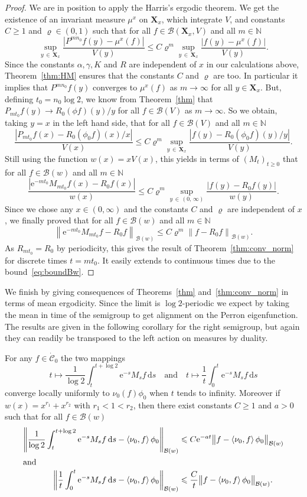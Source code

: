 \documentclass[AHL,Unicode,longabstracts,published]{cedram}
\renewcommand{\leq}{\leqslant}
\renewcommand{\geq}{\geqslant}
\newcommand{\Cdot}{{\dot{\mathcal{C}}}}
\newcommand{\B}{\mathcal{B}}
\newcommand{\N}{\mathbb{N}}
\newcommand{\1}{\mathds{1}}
\newcommand{\X}{\mathbf{X}}
\newcommand{\e}{\mathrm{e}}
\renewcommand{\d}{\mathrm{d}}
\begin{document}
\begin{proof}
We are in position to apply the Harris's ergodic theorem. We get the existence of an invariant measure $\mu^x$ on $\X_x$, which integrate $V$, and constants $C\geq1$ and $\varrho\in(0,1)$ such that for all $f\in\B(\X_x,V)$ and all $m\in\N$
\[
\sup_{y\,\in\,\X_x}\frac{\left|P^{mn_0}f(y)-\mu^x(f)\right|}{V(y)}\leq C\varrho^m\sup_{y\,\in\, \X_x}\frac{\left|f(y)-\mu^x(f)\right|}{V(y)}.
\]
Since the constants $\alpha,\gamma,K$ and $R$ are independent of $x$ in our calculations above, Theorem~\ref{thm:HM} ensures that the constants $C$ and $\varrho$ are too. In particular it implies that $P^{mn_0}f(y)$ converges to $\mu^x(f)$ as $m\to\infty$ for all $y\in\X_x$. But, defining $t_0=n_0\log2$, we know from Theorem~\ref{thm} that $P_{mt_0}f(y)\to R_0(\phi f)(y)/y$ for all $f\in\B(V)$ as $m\to\infty$. So we obtain, taking $y=x$ in the left hand side, that for all $f\in\B(V)$ and all $m\in\N$
\[
\frac{\left|P_{m t_0}f(x)-R_0(\phi_0 f)(x)/x\right|}{V(x)}\leq C\varrho^m\sup_{y\,\in\,\X_x}\frac{\left|f(y)-R_0(\phi_0 f)(y)/y\right|}{V(y)}.
\]
Still using the function $w(x)=xV(x)$, this yields in terms of $(M_t)_{t\geq0}$ that for all $f\in\B(w)$ and all $m\in\N$
\[
\frac{\left|\e^{-mt_0}M_{m t_0}f(x)-R_0f(x)\right|}{w(x)}\leq C\varrho^m\sup_{y\,\in\,(0,\,\infty)}\frac{\left|f(y)-R_0f(y)\right|}{w(y)}.
\]
Since we chose any $x\in(0,\infty)$ and the constants $C$ and $\varrho$ are independent of $x$, we finally proved that for all $f\in\B(w)$ and all $m\in\N$
\[
\left\|\e^{-mt_0}M_{m t_0}f-R_0f\right\|_{\B(w)}\leq C\varrho^m\left\|f-R_0f\right\|_{\B(w)}.
\]
As $R_{mt_0}=R_0$ by periodicity, this gives the result of Theorem~\ref{thm:conv_norm} for discrete times $t=mt_0$. It easily extends to continuous times due to the bound~\eqref{eq:boundBw}.
\end{proof}


We finish by giving consequences of Theorems~\ref{thm} and~\ref{thm:conv_norm} in terms of mean ergodicity. Since the limit is $\log2$-periodic we expect by taking the mean in time of the semigroup to get alignment on the Perron eigenfunction. The results are given in the following corollary for the right semigroup, but again they can readily be transposed to the left action on measures by duality.


\begin{coro}\label{coro}
For any $f\in \Cdot_0$ the two mappings
\[
t\mapsto\frac{1}{\log 2}\int_t^{t+\log 2} \e^{-s}M_sf\, \d s \quad \text{and} \quad t\mapsto\frac{1}{t}\int_0^t \e^{-s}M_sf \,\d s
\]
converge locally uniformly to $\nu_0 (f)\phi_0$ when $t$ tends to infinity. Moreover if $w(x)=x^{r_1}+x^{r_2}$ with $r_1<1<r_2$, then there exist constants $C\geq1$ and $a>0$ such that for all $f\in\B(w)$
\begin{align*}
\left\|\frac{1}{\log 2}\int_t^{t+\log 2} \e^{-s}M_sf\, \d s-\left\langle\nu_0,f\right\rangle\phi_0\right\|_{\B(w)} &\leq C\e^{-at}\big\|f-\left\langle\nu_0,f\right\rangle\phi_0\big\|_{\B(w)}
\\
\intertext{and}
\left\|\frac{1}{t}\int_0^t \e^{-s}M_sf \,\d s-\left\langle\nu_0,f\right\rangle\phi_0\right\|_{\B(w)} &\leq \frac{C}{t}\big\|f-\left\langle\nu_0,f\right\rangle\phi_0\big\|_{\B(w)}.
\end{align*}
\end{coro}
\end{document}
